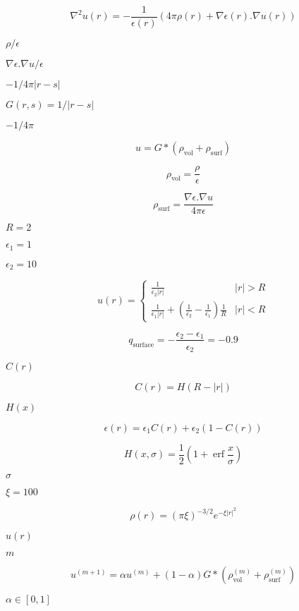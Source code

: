 \documentclass{article}
\begin{document}
\[ \nabla^2 u(r) = - \frac{1}{\epsilon(r)} \left( 4 \pi \rho(r) + \nabla \epsilon(r) . \nabla u(r) \right) \]
\pagebreak

$\rho / \epsilon$
\pagebreak

$\nabla \epsilon . \nabla u / \epsilon$
\pagebreak

$-1 / 4 \pi |r-s|$
\pagebreak

$G(r,s) = 1/|r-s|$
\pagebreak

$-1/4\pi$
\pagebreak

\[ u = G * \left(\rho_{\mbox{vol}} + \rho_{\mbox{surf}} \right) \]
\pagebreak

\[ \rho_{\mbox{vol}} = \frac{\rho}{\epsilon} \]
\pagebreak

\[ \rho_{\mbox{surf}} = \frac{\nabla \epsilon . \nabla u}{4 \pi \epsilon} \]
\pagebreak

$R=2$
\pagebreak

$\epsilon_1 = 1$
\pagebreak

$\epsilon_2 = 10$
\pagebreak

\[ u(r) = \left \lbrace \begin{array}{cc} \frac{1}{\epsilon_2 |r|} & |r| > R \\ \frac{1}{\epsilon_1 |r|} + \left( \frac{1}{\epsilon_2} - \frac{1}{\epsilon_1} \right) \frac{1}{R} & |r| < R \end{array} \right . \]
\pagebreak

\[ q_{\mbox{surface}} = -\frac{\epsilon_2 - \epsilon_1}{\epsilon_2} = -0.9 \]
\pagebreak

$C(r)$
\pagebreak

\[ C(r) = H(R-|r|) \]
\pagebreak

$H(x)$
\pagebreak

\[ \epsilon(r) = \epsilon_1 C(r) + \epsilon_2 \left( 1 - C(r) \right) \]
\pagebreak

\[ H(x,\sigma) = \frac{1}{2} \left( 1 + \mathop{\mathrm{erf}} \frac{x}{\sigma} \right) \]
\pagebreak

$\sigma$
\pagebreak

$\xi=100$
\pagebreak

\[ \rho(r) = \left(\pi \xi \right)^{-3/2} e^{-\xi |r|^2} \]
\pagebreak

$u(r)$
\pagebreak

$m$
\pagebreak

\[ u^{(m+1)} = \alpha u^{(m)} + (1-\alpha) G * \left(\rho^{(m)}_{\mbox{vol}} + \rho^{(m)}_{\mbox{surf}} \right) \]
\pagebreak

$ \alpha \in [0,1]$
\pagebreak
\end{document}
